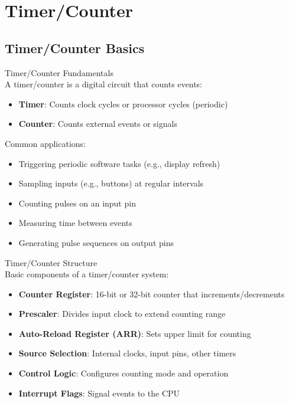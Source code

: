 \section{Timer/Counter}

\subsection{Timer/Counter Basics}

\begin{concept}{Timer/Counter Fundamentals}\\
A timer/counter is a digital circuit that counts events:
\begin{itemize}
    \item \textbf{Timer}: Counts clock cycles or processor cycles (periodic)
    \item \textbf{Counter}: Counts external events or signals
\end{itemize}
Common applications:
\begin{itemize}
    \item Triggering periodic software tasks (e.g., display refresh)
    \item Sampling inputs (e.g., buttons) at regular intervals
    \item Counting pulses on an input pin
    \item Measuring time between events
    \item Generating pulse sequences on output pins
\end{itemize}
\end{concept}

\begin{definition}{Timer/Counter Structure}\\
Basic components of a timer/counter system:
\begin{itemize}
    \item \textbf{Counter Register}: 16-bit or 32-bit counter that increments/decrements
    \item \textbf{Prescaler}: Divides input clock to extend counting range
    \item \textbf{Auto-Reload Register (ARR)}: Sets upper limit for counting
    \item \textbf{Source Selection}: Internal clocks, input pins, other timers
    \item \textbf{Control Logic}: Configures counting mode and operation
    \item \textbf{Interrupt Flags}: Signal events to the CPU
\end{itemize}
\end{definition}

